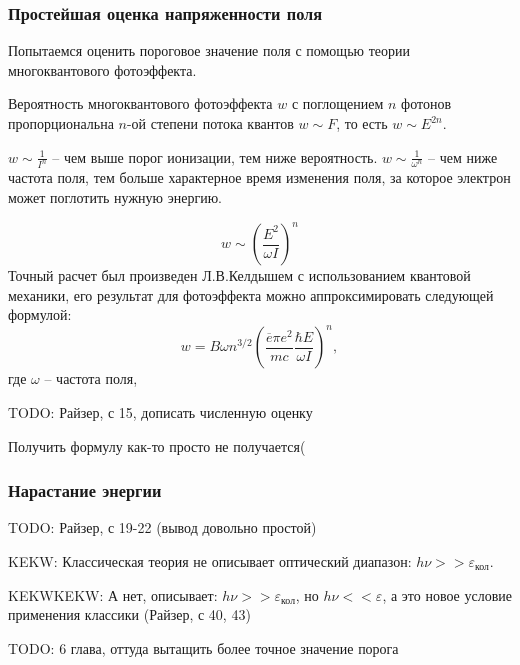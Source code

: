 \documentclass{beamer}
\begin{document}
	\begin{frame}
		\frametitle{Простейшая оценка напряженности поля}
		\footnotesize
		Попытаемся оценить пороговое значение поля с помощью теории многоквантового фотоэффекта.
		
		Вероятность многоквантового фотоэффекта $w$ с поглощением $n$ фотонов пропорциональна $n$-ой степени потока квантов $w \sim F$, то есть $w \sim E^{2n}$.
		
		$w \sim \frac{1}{I^n}$ -- чем выше порог ионизации, тем ниже вероятность.
		$w \sim \frac{1}{\omega^n}$ -- чем ниже частота поля, тем больше характерное время изменения поля, за которое электрон может поглотить нужную энергию.
		
		$$ w \sim \left(\frac{E^2}{\omega I}\right)^n$$
		Точный расчет был произведен Л.В.Келдышем с использованием квантовой механики, его результат для фотоэффекта можно аппроксимировать следующей формулой:
		$$ w = B \omega n^{3/2} \left(\frac{\overline{e} \pi e^2}{mc} \frac{\hbar E}{\omega I}\right)^n,$$
		где $\omega$ -- частота поля,
		
		TODO: Райзер, с 15, дописать численную оценку
		
		Получить формулу как-то просто не получается(
	\end{frame}

	
	\begin{frame}
		\frametitle{Нарастание энергии}
		
		TODO: Райзер, с 19-22 (вывод довольно простой)
		
		KEKW: Классическая теория не описывает оптический диапазон: $h\nu >> \varepsilon_{\text{кол}}$.
		
		KEKWKEKW: А нет, описывает: $ h \nu >> \varepsilon_{\text{кол}}$, но $h\nu << \varepsilon$, а это новое условие применения классики (Райзер, с 40, 43)
	\end{frame}
	
	\begin{frame}
		TODO: 6 глава, оттуда вытащить более точное значение порога
	\end{frame}
	
	
	
\end{document}
